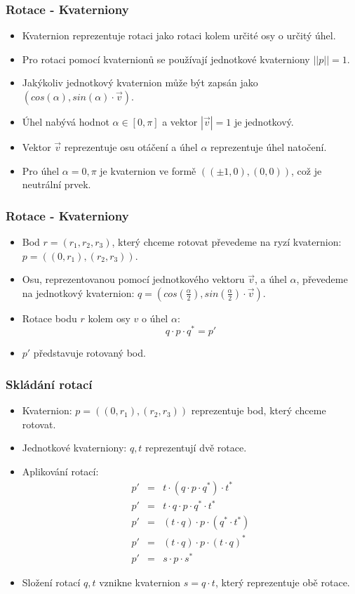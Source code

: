\begin{frame}
\frametitle{Rotace - Kvaterniony}
\begin{itemize}
\item Kvaternion reprezentuje rotaci jako rotaci kolem určité osy o určitý úhel.
\item Pro rotaci pomocí kvaternionů se používají jednotkové kvaterniony $||p||=1$.
\item Jakýkoliv jednotkový kvaternion může být zapsán jako $(cos(\alpha),sin(\alpha)\cdot \vec v)$.
\item Úhel nabývá hodnot $\alpha \in [0,\pi]$ a vektor $|\vec v|=1$ je jednotkový.
\item Vektor $\vec v$ reprezentuje osu otáčení a úhel $\alpha$ reprezentuje úhel natočení.
\item Pro úhel $\alpha=0,\pi$ je kvaternion ve formě $((\pm 1,0),(0,0))$, což je neutrální prvek.
\end{itemize}
\end{frame}

\begin{frame}
\frametitle{Rotace - Kvaterniony}
\begin{itemize}
\item Bod $r=(r_1,r_2,r_3)$, který chceme rotovat převedeme na ryzí kvaternion: $p=((0,r_1),(r_2,r_3))$.
\item Osu, reprezentovanou pomocí jednotkového vektoru $\vec v$, a úhel $\alpha$, převedeme na jednotkový kvaternion: $q=(cos(\frac{\alpha}{2}),sin(\frac{\alpha}{2})\cdot\vec v)$.
\item Rotace bodu $r$ kolem osy $v$ o úhel $\alpha$:
$$q\cdot p \cdot q^*=p'$$
\item $p'$ představuje rotovaný bod.
\end{itemize}
\end{frame}

\begin{frame}
\frametitle{Skládání rotací}
\begin{itemize}
\item Kvaternion: $p=((0,r_1),(r_2,r_3))$ reprezentuje bod, který chceme rotovat.
\item Jednotkové kvaterniony: $q,t$ reprezentují dvě rotace.
\item Aplikování rotací:
\begin{eqnarray*}
p' &=& t\cdot (q\cdot p \cdot q^*)\cdot t^*\\
p' &=& t\cdot q\cdot p \cdot q^*\cdot t^*\\
p' &=& (t\cdot q)\cdot p \cdot (q^*\cdot t^*)\\
p' &=& (t\cdot q)\cdot p \cdot (t \cdot q)^*\\
p' &=& s \cdot p \cdot s^*
\end{eqnarray*}
\item Složení rotací $q,t$ vznikne kvaternion $s=q\cdot t$, který reprezentuje obě rotace.
\end{itemize}
\end{frame}

